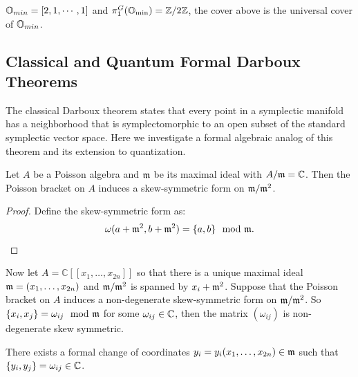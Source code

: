 \begin{rk}
  $\mathbb{O}_{min} = \left[2,1, \cdots,1\right]$ and $\pi_{1}^{G}(\mathbb{O}_{\min}) = \mathbb{Z}/2\mathbb{Z}$, the cover above is the universal cover of $\mathbb{O}_{min}$.
\end{rk}



\subsection{Classical and Quantum Formal Darboux Theorems}

The classical Darboux theorem states that every point in a symplectic manifold has a neighborhood that is symplectomorphic to an open subset of the standard symplectic vector space. Here we investigate a formal algebraic analog of this theorem and its extension to quantization.

\begin{lem}
  Let $A$ be a Poisson algebra and $\mathfrak{m}$ be its maximal ideal with $A/\mathfrak{m} = \mathbb{C}$. Then the Poisson bracket on $A$ induces a skew-symmetric form on $\mathfrak{m}/\mathfrak{m}^2$.
\end{lem}

\begin{proof}
  Define the skew-symmetric form as:
  \[
    \omega(a + \mathfrak{m}^2, b + \mathfrak{m}^2) = \{a,b\} \mod {\mathfrak{m}}.
  \]
\end{proof}

Now let $A = \mathbb{C}[[x_1, \dots, x_{2n}]]$ so that there is a unique maximal ideal $\mathfrak{m} = (x_1, \dots, x_{2n})$ and $\mathfrak{m}/\mathfrak{m}^2$ is spanned by $x_i + \mathfrak{m}^2$. Suppose that the Poisson bracket on $A$ induces a non-degenerate skew-symmetric form on $\mathfrak{m}/\mathfrak{m}^2$. So $\{x_i, x_j\} = \omega_{ij} \mod {\mathfrak{m}}$ for some $\omega_{ij} \in \mathbb{C}$, then the matrix $(\omega_{ij})$ is non-degenerate skew symmetric.

\begin{thm}
   There exists a formal change of coordinates $y_i = y_i(x_1, \dots, x_{2n}) \in \mathfrak{m}$ such that $\{y_i, y_j\} = \omega_{ij} \in \mathbb{C}$.
\end{thm}


